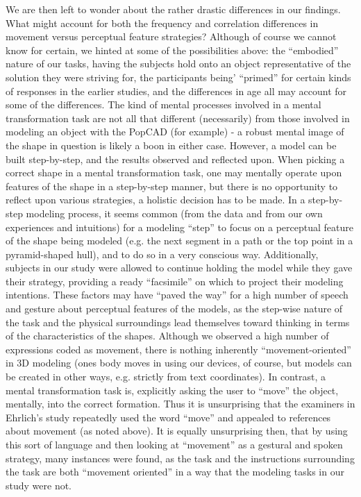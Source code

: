 We are then left to wonder about the rather drastic differences in our findings.
What might account for both the frequency and correlation differences in
movement versus perceptual feature strategies? Although of course we cannot know
for certain, we hinted at some of the possibilities above: the ``embodied''
nature of our tasks, having the subjects hold onto an object representative of
the solution they were striving for, the participants being' ``primed'' for
certain kinds of responses in the earlier studies, and the differences in age
all may account for some of the differences. The kind of mental processes
involved in a mental transformation task are not all that different
(necessarily) from those involved in modeling an object with the PopCAD (for
example) - a robust mental image of the shape in question is likely a boon in
either case. However, a model can be built step-by-step, and the results
observed and reflected upon. When picking a correct shape in a mental
transformation task, one may mentally operate upon features of the shape in a
step-by-step manner, but there is no opportunity to reflect upon various
strategies, a holistic decision has to be made. In a step-by-step modeling
process, it seems common (from the data and from our own experiences and
intuitions) for a modeling ``step'' to focus on a perceptual feature of the
shape being modeled (e.g. the next segment in a path or the top point in a
pyramid-shaped hull), and to do so in a very conscious way. Additionally,
subjects in our study were allowed to continue holding the model while they gave
their strategy, providing a ready ``facsimile'' on which to project their
modeling intentions. These factors may have ``paved the way'' for a high number
of speech and gesture about perceptual features of the models, as the step-wise
nature of the task and the physical surroundings lead themselves toward thinking
in terms of the characteristics of the shapes. Although we observed a high
number of expressions coded as movement, there is nothing inherently
``movement-oriented'' in 3D modeling (ones body moves in using our devices, of
course, but models can be created in other ways, e.g. strictly from text
coordinates). In contrast, a mental transformation task is, explicitly asking
the user to ``move'' the object, mentally, into the correct formation. Thus it
is unsurprising that the examiners in Ehrlich's study repeatedly used the word
``move'' and appealed to references about movement (as noted above). It is
equally unsurprising then, that by using this sort of language and then looking
at ``movement'' as a gestural and spoken strategy, many instances were found, as
the task and the instructions surrounding the task are both ``movement
oriented'' in a way that the modeling tasks in our study were not. 

